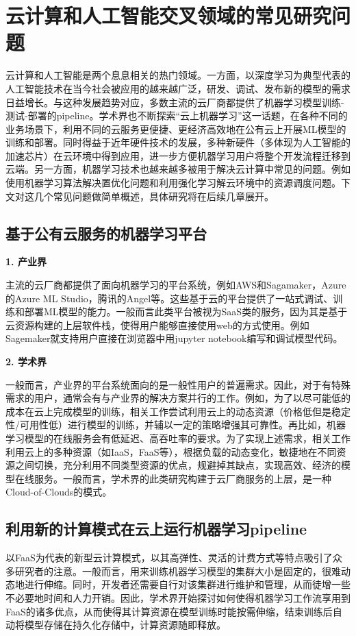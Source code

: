 \section{云计算和人工智能交叉领域的常见研究问题}
云计算和人工智能是两个息息相关的热门领域。一方面，以深度学习为典型代表的人工智能技术在当今社会被应用的越来越广泛，研发、调试、发布新的模型的需求日益增长。与这种发展趋势对应，多数主流的云厂商都提供了机器学习模型训练-测试-部署的pipeline。学术界也不断探索“云上机器学习”这一话题，在各种不同的业务场景下，利用不同的云服务更便捷、更经济高效地在公有云上开展ML模型的训练和部署。同时得益于近年硬件技术的发展，多种新硬件（多体现为人工智能的加速芯片）在云环境中得到应用，进一步方便机器学习用户将整个开发流程迁移到云端。另一方面，机器学习技术也越来越多被用于解决云计算中常见的问题。例如使用机器学习算法解决置优化问题和利用强化学习解云环境中的资源调度问题。下文对这几个常见问题做简单概述，具体研究将在后续几章展开。

\subsection{基于公有云服务的机器学习平台}
\textbf{1. 产业界}

主流的云厂商都提供了面向机器学习的平台系统，例如AWS和Sagamaker\parencite{joshi2020amazon,liberty2020elastic,perrone2020amazon}，Azure的Azure ML Studio\parencite{etaati2019azure}，腾讯的Angel\parencite{jiang2018angel}等。这些基于云的平台提供了一站式调试、训练和部署ML模型的能力。一般而言此类平台被视为SaaS类的服务，因为其是基于云资源构建的上层软件栈，使得用户能够直接使用web的方式使用。例如Sagemaker就支持用户直接在浏览器中用jupyter notebook编写和调试模型代码。

\textbf{2. 学术界}

一般而言，产业界的平台系统面向的是一般性用户的普遍需求。因此，对于有特殊需求的用户，通常会有与产业界的解决方案并行的工作。例如，为了以尽可能低的成本在云上完成模型的训练，相关工作\parencite{harlap2017proteus,li2020spottune}尝试利用云上的动态资源（价格低但是稳定性/可用性低）进行模型的训练，并辅以一定的策略增强其可靠性。再比如，机器学习模型的在线服务会有低延迟、高吞吐率的要求。为了实现上述需求，相关工作\parencite{zhang2019mark}利用云上的多种资源（如IaaS，FaaS等），根据负载的动态变化，敏捷地在不同资源之间切换，充分利用不同类型资源的优点，规避掉其缺点，实现高效、经济的模型在线服务。一般而言，学术界的此类研究构建于云厂商服务的上层，是一种Cloud-of-Clouds的模式。

\subsection{利用新的计算模式在云上运行机器学习pipeline}
以FaaS为代表的新型云计算模式，以其高弹性、灵活的计费方式等特点吸引了众多研究者的注意。一般而言，用来训练机器学习模型的集群大小是固定的，很难动态地进行伸缩。同时，开发者还需要自行对该集群进行维护和管理，从而徒增一些不必要地时间和人力开销。因此，学术界开始探讨如何使得机器学习工作流享用到FaaS的诸多优点\parencite{wang2019distributed}，从而使得其计算资源在模型训练时能按需伸缩，结束训练后自动将模型存储在持久化存储中，计算资源随即释放。

